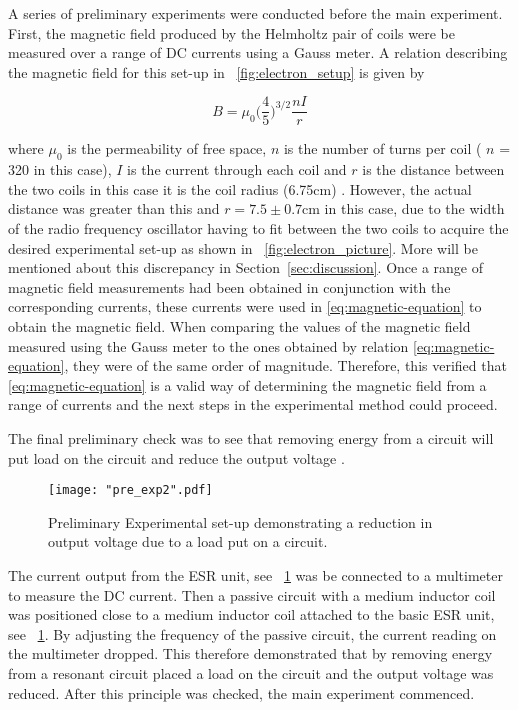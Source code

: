 \documentclass{article}
\newcommand{\figref}[2][\figurename~]{#1\ref{#2}}
\newcommand{\secref}[2][Section~]{#1\ref{#2}}
\begin{document}
\vspace{2mm}
\noindent
A series of preliminary experiments were conducted before the main experiment. First, the magnetic field produced by the Helmholtz pair of coils were be measured over a range of DC currents using a Gauss meter. A relation describing the magnetic field for this set-up in \figref{fig:electron_setup} is given by

\begin{equation}
\label{eq:magnetic-equation}
B = \mu_0\Bigg(\frac{4}{5}\Bigg)^{3/2}\frac{nI}{r}
\end{equation}

\vspace{2mm}
\noindent
where $\mu_0$ is the permeability of free space, $n$ is the number of turns per coil ( $n$ = 320 in this case), $I$ is the current through each coil and $r$ is the distance between the two coils in this case it is the coil radius (6.75cm) \cite{Paper02}. However, the actual distance was greater than this and $r = 7.5 \pm 0.7$cm in this case, due to the width of the radio frequency oscillator having to fit between the two coils to acquire the desired experimental set-up as shown in \figref{fig:electron_picture}. More will be mentioned about this discrepancy in \secref{sec:discussion}. Once a range of magnetic field measurements had been obtained in conjunction with the corresponding currents, these currents were used in \eqref{eq:magnetic-equation} to obtain the magnetic field. When comparing the values of the magnetic field measured using the Gauss meter to the ones obtained by relation \eqref{eq:magnetic-equation}, they were of the same order of magnitude. Therefore, this verified that \eqref{eq:magnetic-equation} is a valid way of determining the magnetic field from a range of currents and the next steps in the experimental method could proceed.

\vspace{2mm}
\noindent
The final preliminary check was to see that removing energy from a circuit will put load on the circuit and reduce the output voltage \cite{Paper02}.

\begin{figure}[h]
\centering
\texttt{[image: "pre\_exp2".pdf]}
\caption{Preliminary Experimental set-up demonstrating a reduction in output voltage due to a load put on a circuit.}
\label{fig:pre_exp2}
\end{figure}


\vspace{2mm}
\noindent
The current output from the ESR unit, see \figref{fig:pre_exp2} was be connected to a multimeter to measure the DC current. Then a passive circuit with a medium inductor coil was positioned close to a medium inductor coil attached to the basic ESR unit, see \figref{fig:pre_exp2}. By adjusting the frequency of the passive circuit, the current reading on the multimeter dropped. This therefore demonstrated that by removing energy from a resonant circuit placed a load on the circuit and the output voltage was reduced. After this principle was checked, the main experiment commenced.
\end{document}
